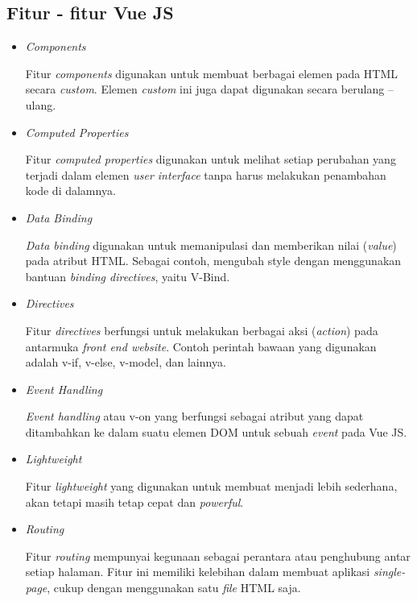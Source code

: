 {{\subsection{Fitur - fitur Vue JS}
\begin{itemize}
  \item \textit{Components}
  
  Fitur \textit{components} digunakan untuk membuat berbagai elemen pada HTML secara \textit{custom}. Elemen \textit{custom} ini juga dapat digunakan secara berulang – ulang.

  \item \textit{Computed Properties}
  
  Fitur \textit{computed properties} digunakan untuk melihat setiap perubahan yang terjadi dalam elemen \textit{user interface} tanpa harus melakukan penambahan kode di dalamnya.

  \item \textit{Data Binding}
  
  \textit{Data binding} digunakan untuk memanipulasi dan memberikan nilai (\textit{value}) pada atribut HTML. Sebagai contoh, mengubah style dengan menggunakan bantuan \textit{binding directives}, yaitu V-Bind.

  \item \textit{Directives}
  
  Fitur \textit{directives} berfungsi untuk melakukan berbagai aksi (\textit{action}) pada antarmuka \textit{front end website}. Contoh perintah bawaan yang digunakan adalah v-if, v-else, v-model, dan lainnya.

  \item \textit{Event Handling}
  
  \textit{Event handling} atau v-on yang berfungsi sebagai atribut yang dapat ditambahkan ke dalam suatu elemen DOM untuk sebuah \textit{event} pada Vue JS.

  \item \textit{Lightweight}
  
  Fitur \textit{lightweight} yang digunakan untuk membuat menjadi lebih sederhana, akan tetapi masih tetap cepat dan \textit{powerful}.

  \item \textit{Routing}
  
  Fitur \textit{routing} mempunyai kegunaan sebagai perantara atau penghubung antar setiap halaman. Fitur ini memiliki kelebihan dalam membuat aplikasi \textit{single-page}, cukup dengan menggunakan satu \textit{file} HTML saja.


\end{itemize}}}
